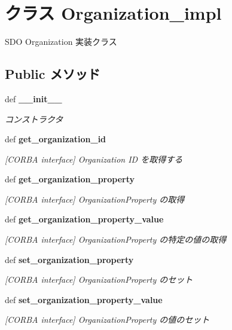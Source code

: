 \section{クラス Organization\_\-impl}
\label{classsource__py_1_1_sdo_organization_1_1_organization__impl}
SDO Organization 実装クラス  


\subsection*{Public メソッド}
\begin{CompactItemize}
\item 
def {\bf \_\-\_\-init\_\-\_\-}
\begin{CompactList}\small\item\em コンストラクタ \item\end{CompactList}\item 
def {\bf get\_\-organization\_\-id}
\begin{CompactList}\small\item\em [CORBA interface] Organization ID を取得する \item\end{CompactList}\item 
def {\bf get\_\-organization\_\-property}
\begin{CompactList}\small\item\em [CORBA interface] OrganizationProperty の取得 \item\end{CompactList}\item 
def {\bf get\_\-organization\_\-property\_\-value}
\begin{CompactList}\small\item\em [CORBA interface] OrganizationProperty の特定の値の取得 \item\end{CompactList}\item 
def {\bf set\_\-organization\_\-property}
\begin{CompactList}\small\item\em [CORBA interface] OrganizationProperty のセット \item\end{CompactList}\item 
def {\bf set\_\-organization\_\-property\_\-value}
\begin{CompactList}\small\item\em [CORBA interface] OrganizationProperty の値のセット \item\end{CompactList}\item 

\end{CompactItemize}
